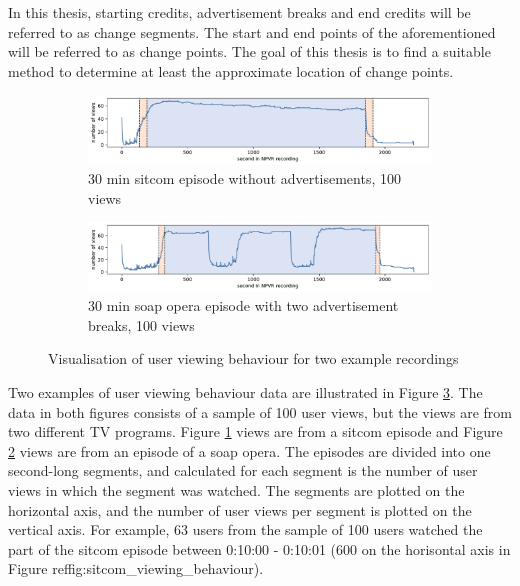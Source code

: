 In this thesis, starting credits, advertisement breaks and end credits will be referred to as change segments. The start and end points of the aforementioned will be referred to as change points. The goal of this thesis is to find a suitable method to determine at least the approximate location of change points.%

\begin{figure}[h]
    \centering
    \begin{subfigure}[b]{\textwidth}
       \includegraphics[width=1\textwidth]{../plots/sitcom.pdf}
       \caption{30 min sitcom episode without advertisements, 100 views}
       \label{fig:sitcom_viewing_behaviour} 
    \end{subfigure}
    
    \begin{subfigure}[b]{\textwidth}
       \includegraphics[width=1\textwidth]{../plots/soap_opera.pdf}
       \caption{30 min soap opera episode with two advertisement breaks, 100 views}
       \label{fig:soap_opera_viewing_behaviour}
    \end{subfigure}
    \caption{Visualisation of user viewing behaviour for two example recordings}
    \label{fig:user_viewing_behaviour}
\end{figure}

Two examples of %
user viewing behaviour data are illustrated in Figure \ref{fig:user_viewing_behaviour}.
The data in both figures consists of a sample of 100 user views, but the views are from two different TV programs. Figure \ref{fig:sitcom_viewing_behaviour} views are from a sitcom episode and Figure \ref{fig:soap_opera_viewing_behaviour} views are from an episode of a soap opera. The episodes are divided into one second-long segments, and calculated for each segment is the number of user views in which the segment was watched. The segments are plotted on the horizontal axis, and the number of user views per segment is plotted on the vertical axis. For example, 63 users from the sample of 100 users watched the part of the sitcom episode between 0:10:00 - 0:10:01 (600 on the horisontal axis in Figure ref{fig:sitcom_viewing_behaviour}).

